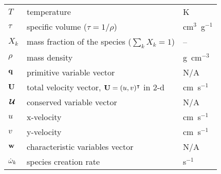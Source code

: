 \begin{center}
\begin{longtable}{|l|p{4.0in}|l|}
%
$T$     & temperature                                & K \\
%
$\tau$  & specific volume ($\tau = 1/\rho$)          & cm$^3$~g$^{-1}$ \\
%
$X_k$   & mass fraction of the species ($\sum_k X_k = 1$) & -- \\
%
$\rho$  & mass density  & g~cm$^{-3}$ \\
%
${\bf q}$     & primitive variable vector                 & N/A \\
%
${\bf U}$   & total velocity vector, ${\bf U} = (u, v)^\intercal$ in 2-d & cm~s$^{-1}$ \\
%
${\,\boldsymbol{\mathcal{U}}}$   & conserved variable vector & N/A \\
%
$u$     & x-velocity   & cm~s$^{-1}$ \\
%
$v$     & y-velocity   & cm~s$^{-1}$ \\
%
${\bf w}$     & characteristic variables vector                   & N/A \\
%
${\dot{\omega}}_k$ & species creation rate                         & s$^{-1}$ \\
\end{longtable}
\end{center}
\renewcommand{\arraystretch}{1.0}


